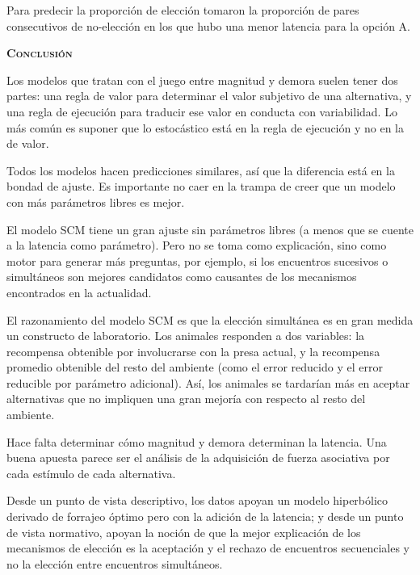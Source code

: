 \documentclass[a4paper,12pt]{article}
\begin{document}
Para predecir la proporción de elección tomaron la proporción de pares consecutivos de no-elección en los que hubo una menor latencia para la opción A.

{\scshape\bfseries Conclusión}

Los modelos que tratan con el juego entre magnitud y demora suelen tener dos partes: una regla de valor para determinar el valor subjetivo de una alternativa, y una regla de ejecución para traducir ese valor en conducta con variabilidad. Lo más común es suponer que lo estocástico está en la regla de ejecución y no en la de valor.

Todos los modelos hacen predicciones similares, así que la diferencia está en la bondad de ajuste. Es importante no caer en la trampa de creer que un modelo con más parámetros libres es mejor.

El modelo SCM tiene un gran ajuste sin parámetros libres (a menos que se cuente a la latencia como parámetro). Pero no se toma como explicación, sino como motor para generar más preguntas, por ejemplo, si los encuentros sucesivos o simultáneos son mejores candidatos como causantes de los mecanismos encontrados en la actualidad.

El razonamiento del modelo SCM es que la elección simultánea es en gran medida un constructo de laboratorio. Los animales responden a dos variables: la recompensa obtenible por involucrarse con la presa actual, y la recompensa promedio obtenible del resto del ambiente (como el error reducido y el error reducible por parámetro adicional). Así, los animales se tardarían más en aceptar alternativas que no impliquen una gran mejoría con respecto al resto del ambiente.

Hace falta determinar cómo magnitud y demora determinan la latencia. Una buena apuesta parece ser el análisis de la adquisición de fuerza asociativa por cada estímulo de cada alternativa.

Desde un punto de vista descriptivo, los datos apoyan un modelo hiperbólico derivado de forrajeo óptimo pero con la adición de la latencia; y desde un punto de vista normativo, apoyan la noción de que la mejor explicación de los mecanismos de elección es la aceptación y el rechazo de encuentros secuenciales y no la elección entre encuentros simultáneos.

\end{document}
